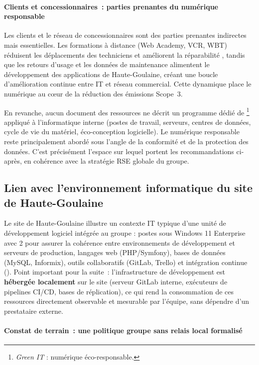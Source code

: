 \paragraph{Clients et concessionnaires~: parties prenantes du numérique responsable}

Les clients et le réseau de concessionnaires sont des parties prenantes indirectes mais essentielles. Les formations à distance (Web Academy, VCR, WBT) réduisent les déplacements des techniciens et améliorent la réparabilité \cite{iveco_annual_2025}, tandis que les retours d'usage et les données de maintenance alimentent le développement des applications de Haute-Goulaine, créant une boucle d'amélioration continue entre IT et réseau commercial. Cette dynamique place le numérique au cœur de la réduction des émissions Scope~3.

En revanche, aucun document des ressources ne décrit un programme dédié de \textit{}\footnote{\textit{Green IT} : numérique éco-responsable.} appliqué à l'informatique interne (postes de travail, serveurs, centres de données, cycle de vie du matériel, éco-conception logicielle). Le numérique responsable reste principalement abordé sous l'angle de la conformité et de la protection des données. C'est précisément l'espace sur lequel portent les recommandations ci-après, en cohérence avec la stratégie RSE globale du groupe.

\subsection{Lien avec l'environnement informatique du site de Haute-Goulaine}

Le site de Haute-Goulaine illustre un contexte IT typique d'une unité de développement logiciel intégrée au groupe : postes sous Windows 11 Enterprise avec  2 pour assurer la cohérence entre environnements de développement et serveurs de production, langages web (PHP/Symfony), bases de données (MySQL, Informix), outils collaboratifs (GitLab, Trello) et intégration continue (). Point important pour la suite~: l'infrastructure de développement est \textbf{hébergée localement} sur le site (serveur GitLab interne, exécuteurs de pipelines CI/CD, bases de réplication), ce qui rend la consommation de ces ressources directement observable et mesurable par l'équipe, sans dépendre d'un prestataire externe.

\paragraph{Constat de terrain~: une politique groupe sans relais local formalisé}

